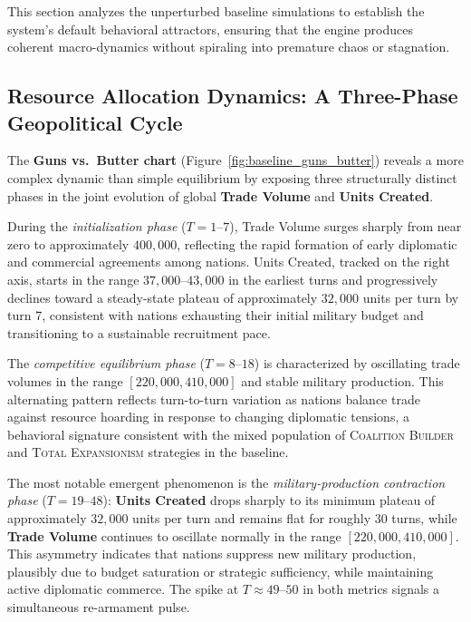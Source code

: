 This section analyzes the unperturbed baseline simulations to establish the system's default behavioral attractors, ensuring that the engine produces coherent macro-dynamics without spiraling into premature chaos or stagnation.


\subsection{Resource Allocation Dynamics: A Three-Phase Geopolitical Cycle}
The \textbf{Guns vs.\ Butter chart} (Figure~\ref{fig:baseline_guns_butter}) reveals a more complex dynamic than simple equilibrium by exposing three structurally distinct phases in the joint evolution of global \textbf{Trade Volume} and \textbf{Units Created}.

During the \textit{initialization phase} ($T = 1$--$7$), Trade Volume surges sharply from near zero to approximately $400{,}000$, reflecting the rapid formation of early diplomatic and commercial agreements among nations. Units Created, tracked on the right axis, starts in the range $37{,}000$--$43{,}000$ in the earliest turns and progressively declines toward a steady-state plateau of approximately $32{,}000$ units per turn by turn 7, consistent with nations exhausting their initial military budget and transitioning to a sustainable recruitment pace.

The \textit{competitive equilibrium phase} ($T = 8$--$18$) is characterized by oscillating trade volumes in the range $[220{,}000, 410{,}000]$ and stable military production. This alternating pattern reflects turn-to-turn variation as nations balance trade against resource hoarding in response to changing diplomatic tensions, a behavioral signature consistent with the mixed population of \textsc{Coalition Builder} and \textsc{Total Expansionism} strategies in the baseline.

The most notable emergent phenomenon is the \textit{military-production contraction phase} ($T = 19$--$48$): \textbf{Units Created} drops sharply to its minimum plateau of approximately $32{,}000$ units per turn and remains flat for roughly 30 turns, while \textbf{Trade Volume} continues to oscillate normally in the range $[220{,}000, 410{,}000]$. This asymmetry indicates that nations suppress new military production, plausibly due to budget saturation or strategic sufficiency, while maintaining active diplomatic commerce. The spike at $T \approx 49$--$50$ in both metrics signals a simultaneous re-armament pulse.

